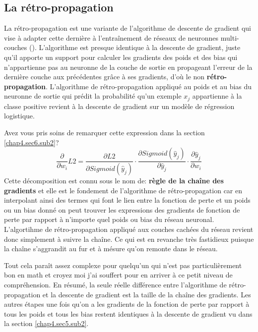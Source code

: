 \subsection{La rétro-propagation}
\label{chap4.sec7.sub1}
La rétro-propagation est une variante de l'algorithme de descente de gradient qui vise à adapter cette dernière à l'entraînement de réseaux de neuronnes multi-couches (\cite{nielse2018nneural}). L'algorithme est presque identique à la descente de gradient, juste qu'il apporte un support pour calculer les gradients des poids et des bias qui n'appartienne pas au neuronne de la couche de sortie en propageant l'erreur de la dernière couche aux précédentes grâce à ses gradients, d'où le non \textbf{rétro-propagation}. L'algorithme de rétro-propagation appliqué au poids et au bias du neuronne de sortie qui prédit la probabilité qu'un exemple \(x_j\) appartienne à la classe positive revient à la descente de gradient sur un modèle de régression logistique.

Avez vous pris soins de remarquer cette expression dans la section \ref{chap4.sec6.sub2}? \[\frac{\partial}{\partial w_i} L2 = \frac{\partial L2}{\partial Sigmoid(\hat{y}_j)} \cdot \frac{\partial Sigmoid(\hat{y}_j)}{\partial \hat{y}_j} \cdot \frac{\partial \hat{y}_j}{\partial w_i}\] Cette décomposition est connu sous le nom de: \textbf{règle de la chaîne des gradients} et elle est le fondement de l'algorithme de rétro-propagation car en interpolant ainsi des termes qui font le lien entre la fonction de perte et un poids ou un bias donné on peut trouver les expressions des gradients de fonction de perte par rapport à n'importe quel poids ou bias du réseau neuronal. L'algortihme de rétro-propagation appliqué aux couches cachées du réseau revient donc simplement à suivre la chaîne. Ce qui est en revanche très fastidieux puisque la chaîne s'aggrandit au fur et à mésure qu'on remonte dans le réseau. 

Tout cela paraît assez complexe pour quelqu'un qui n'est pas particulièrement bon en math et croyez moi j'ai souffert pour en arriver à ce petit niveau de compréhension. En résumé, la seule réelle différence entre l'algorithme de rétro-propagation et la descente de gradient est la taille de la chaîne des gradients. Les autres étapes une fois qu'on a les gradients de la fonction de perte par rapport à tous les poids et tous les bias restent identiques à la descente de gradient vu dans la section \ref{chap4.sec5.sub2}.

